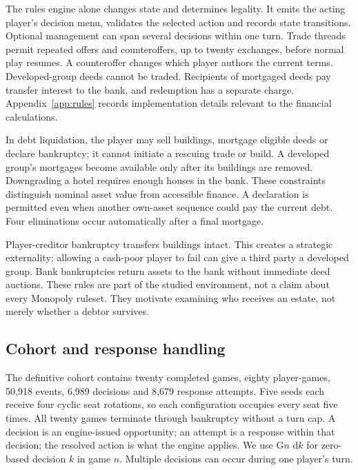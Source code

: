 The rules engine alone changes state and determines legality. It emits the acting player's decision menu, validates the selected action and records state transitions. Optional management can span several decisions within one turn. Trade threads permit repeated offers and counteroffers, up to twenty exchanges, before normal play resumes. A counteroffer changes which player authors the current terms. Developed-group deeds cannot be traded. Recipients of mortgaged deeds pay transfer interest to the bank, and redemption has a separate charge. Appendix~\ref{app:rules} records implementation details relevant to the financial calculations.

In debt liquidation, the player may sell buildings, mortgage eligible deeds or declare bankruptcy; it cannot initiate a rescuing trade or build. A developed group's mortgages become available only after its buildings are removed. Downgrading a hotel requires enough houses in the bank. These constraints distinguish nominal asset value from accessible finance. A declaration is permitted even when another own-asset sequence could pay the current debt. Four eliminations occur automatically after a final mortgage.

Player-creditor bankruptcy transfers buildings intact. This creates a strategic externality: allowing a cash-poor player to fail can give a third party a developed group. Bank bankruptcies return assets to the bank without immediate deed auctions. These rules are part of the studied environment, not a claim about every Monopoly ruleset. They motivate examining who receives an estate, not merely whether a debtor survives.

\subsection{Cohort and response handling}

The definitive cohort contains twenty completed games, eighty player-games, 50,918 events, 6,989 decisions and 8,679 response attempts. Five seeds each receive four cyclic seat rotations, so each configuration occupies every seat five times. All twenty games terminate through bankruptcy without a turn cap. A decision is an engine-issued opportunity; an attempt is a response within that decision; the resolved action is what the engine applies. We use G$n$ d$k$ for zero-based decision $k$ in game $n$. Multiple decisions can occur during one player's turn.

